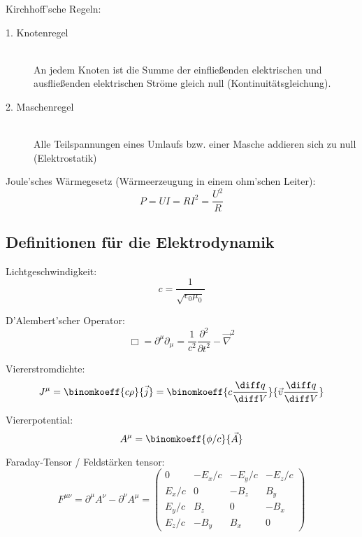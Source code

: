\documentclass[11pt]{article}
\numberwithin{equation}{section}
\begin{document}
        Kirchhoff'sche Regeln:
        \begin{description}
          \item[1. Knotenregel]\hfill \\
            An jedem Knoten ist die Summe der einfließenden elektrischen und ausfließenden elektrischen Ströme gleich null (Kontinuitätsgleichung).
          \item[2. Maschenregel]\hfill \\
            Alle Teilspannungen eines Umlaufs bzw. einer Masche addieren sich zu null (Elektrostatik)
        \end{description}

        Joule'sches Wärmegesetz (Wärmeerzeugung in einem ohm'schen Leiter):
        \begin{equation}
          P = UI = RI^2 = \frac{U^2}{R}
        \end{equation}



    \subsection{Definitionen für die Elektrodynamik}
      Lichtgeschwindigkeit:
      \begin{equation}
        c=\frac{1}{\sqrt{\epsilon_0 \mu_0}}
      \end{equation}

      D'Alembert'scher Operator:
      \begin{equation}
        \Box = \partial^\mu \partial_\mu = \frac{1}{c^2}\frac{\partial^2}{\partial t^2} - \vec{\nabla}^2
      \end{equation}

      Viererstromdichte:
      \begin{equation}
        J^\mu = \binomkoeff{c\rho}{\vec{j}} = \binomkoeff{c\tder{q}{V}}{\vec{v}\tder{q}{V}}
      \end{equation}

      Viererpotential:
      \begin{equation}
        A^\mu = \binomkoeff{\phi/c}{\vec{A}}
      \end{equation}

      Faraday-Tensor / Feldstärken tensor:
      \begin{equation}
        F^{\mu\nu} = \partial^\mu A^\nu - \partial^\nu A^\mu
        = \left( \begin{matrix}
          0 & -E_x/c & -E_y/c & -E_z/c \\
          E_x/c & 0 & -B_z & B_y \\
          E_y/c  & B_z & 0 & -B_x \\
          E_z/c & -B_y & B_x & 0
        \end{matrix} \right)
      \end{equation}
\end{document}
